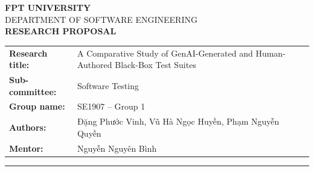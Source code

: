 \documentclass[12pt,a4paper]{article}
\begin{document}
\begin{center}
    {\large \textbf{FPT UNIVERSITY}}\\[0.1cm]
    {\normalsize DEPARTMENT OF SOFTWARE ENGINEERING}\\[1cm]
    {\Large \textbf{RESEARCH PROPOSAL}}\\[0.8cm]
\end{center}

\begin{tabularx}{\textwidth}{lY}
    \textbf{Research title:} & A Comparative Study of GenAI-Generated and Human-Authored Black-Box Test Suites \\[0.3cm]
    \textbf{Sub-committee:}  & Software Testing \\[0.2cm]
    \textbf{Group name:}     & SE1907 -- Group 1 \\[0.2cm]
    \textbf{Authors:}        & Đặng Phước Vinh, Vũ Hà Ngọc Huyền, Phạm Nguyễn Quyền \\[0.2cm]
    \textbf{Mentor:}         & Nguyễn Nguyên Bình \\[0.2cm]
\end{tabularx}

\vspace{1cm}
\noindent\rule{\textwidth}{0.4pt}
\vspace{0.5cm}

\end{document}
